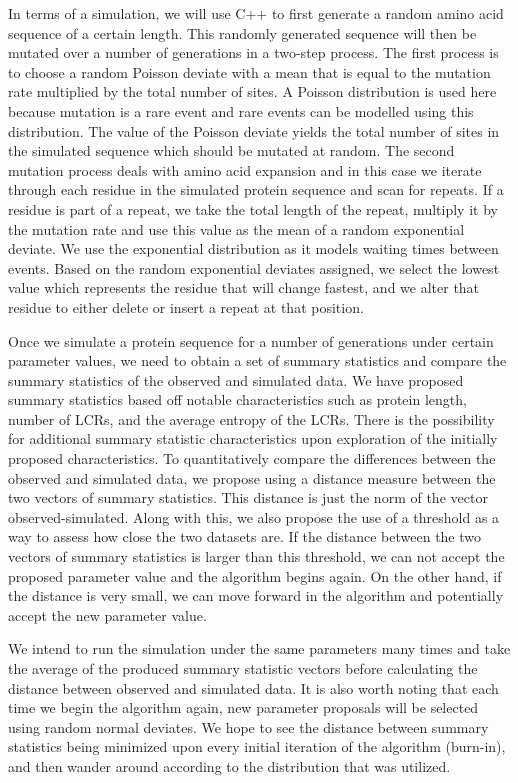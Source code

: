 \documentclass[10pt]{article}
\begin{document}
In terms of a simulation, we will use C++ to first generate a random amino acid sequence of a certain length. This
randomly generated sequence will then be mutated over a number of generations in a two-step process. The first process is
to choose a random Poisson deviate with a mean that is equal to the mutation rate multiplied by the total number of sites. A
Poisson distribution is used here because mutation is a rare event and rare events can be modelled using this distribution. The
value of the Poisson deviate yields the total number of sites in the simulated sequence which should be mutated at random.
The second mutation process deals with amino acid expansion and in this case we iterate through each residue in the simulated
protein sequence and scan for repeats. If a residue is part of a repeat, we take the total length of the repeat, multiply it by the
mutation rate and use this value as the mean of a random exponential deviate. We use the exponential distribution as it models
waiting times between events. Based on the random exponential deviates assigned, we select the lowest value which represents
the residue that will change fastest, and we alter that residue to either delete or insert a repeat at that position.

Once we simulate a protein sequence for a number of generations under certain parameter values, we need to obtain a
set of summary statistics and compare the summary statistics of the observed and simulated data. We have proposed summary
statistics based off notable characteristics such as protein length, number of LCRs, and the average entropy of the LCRs. There
is the possibility for additional summary statistic characteristics upon exploration of the initially proposed characteristics. To
quantitatively compare the differences between the observed and simulated data, we propose using a distance measure between
the two vectors of summary statistics. This distance is just the norm of the vector observed-simulated. Along with this, we also
propose the use of a threshold as a way to assess how close the two datasets are. If the distance between the two vectors of
summary statistics is larger than this threshold, we can not accept the proposed parameter value and the algorithm begins again.
On the other hand, if the distance is very small, we can move forward in the algorithm and potentially accept the new parameter
value.

We intend to run the simulation under the same parameters many times and take the average of the produced summary
statistic vectors before calculating the distance between observed and simulated data. It is also worth noting that each time we
begin the algorithm again, new parameter proposals will be selected using random normal deviates. We hope to see the distance
between summary statistics being minimized upon every initial iteration of the algorithm (burn-in), and then wander around according to the distribution that was utilized. 
\end{document}
